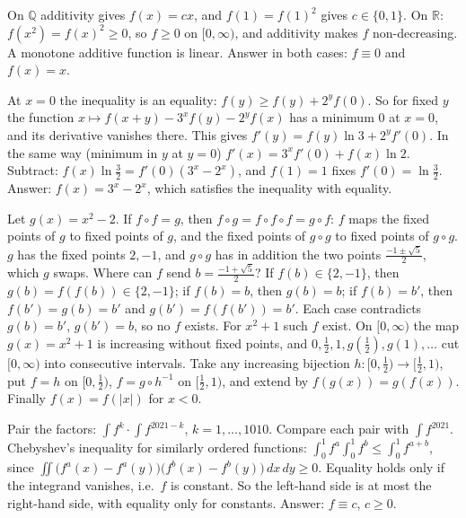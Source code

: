 \documentclass[11pt,a4paper]{article}
\begin{document}

 On \(\mathbb Q\) additivity gives \(f(x)=cx\), and \(f(1)=f(1)^2\) gives \(c\in\{0,1\}\).
 On \(\mathbb R\): \(f(x^2)=f(x)^2\ge0\), so \(f\ge0\) on \([0,\infty)\), and additivity makes \(f\) non-decreasing. A monotone additive function is linear. Answer in both cases: \(f\equiv0\) and \(f(x)=x\).

 At \(x=0\) the inequality is an equality: \(f(y)\ge f(y)+2^yf(0)\). So for fixed \(y\) the function \(x\mapsto f(x+y)-3^xf(y)-2^yf(x)\) has a minimum \(0\) at \(x=0\), and its derivative vanishes there.
 This gives \(f'(y)=f(y)\ln3+2^yf'(0)\). In the same way (minimum in \(y\) at \(y=0\)) \(f'(x)=3^xf'(0)+f(x)\ln2\).
 Subtract: \(f(x)\ln\frac32=f'(0)(3^x-2^x)\), and \(f(1)=1\) fixes \(f'(0)=\ln\frac32\). Answer: \(f(x)=3^x-2^x\), which satisfies the inequality with equality.

 Let \(g(x)=x^2-2\). If \(f\circ f=g\), then \(f\circ g=f\circ f\circ f=g\circ f\): \(f\) maps the fixed points of \(g\) to fixed points of \(g\), and the fixed points of \(g\circ g\) to fixed points of \(g\circ g\).
 \(g\) has the fixed points \(2,-1\), and \(g\circ g\) has in addition the two points \(\frac{-1\pm\sqrt5}2\), which \(g\) swaps. Where can \(f\) send \(b=\frac{-1+\sqrt5}2\)? If \(f(b)\in\{2,-1\}\), then \(g(b)=f(f(b))\in\{2,-1\}\); if \(f(b)=b\), then \(g(b)=b\); if \(f(b)=b'\), then \(f(b')=g(b)=b'\) and \(g(b')=f(f(b'))=b'\). Each case contradicts \(g(b)=b'\), \(g(b')=b\), so no \(f\) exists.
 For \(x^2+1\) such \(f\) exist. On \([0,\infty)\) the map \(g(x)=x^2+1\) is increasing without fixed points, and \(0,\frac12,1,g(\frac12),g(1),\dots\) cut \([0,\infty)\) into consecutive intervals. Take any increasing bijection \(h\colon[0,\frac12)\to[\frac12,1)\), put \(f=h\) on \([0,\frac12)\), \(f=g\circ h^{-1}\) on \([\frac12,1)\), and extend by \(f(g(x))=g(f(x))\). Finally \(f(x)=f(|x|)\) for \(x\lt0\).

 Pair the factors: \(\int f^k\cdot\int f^{2021-k}\), \(k=1,\dots,1010\). Compare each pair with \(\int f^{2021}\).
 Chebyshev's inequality for similarly ordered functions: \(\int_0^1f^a\int_0^1f^b\le\int_0^1f^{a+b}\), since \(\iint\bigl(f^a(x)-f^a(y)\bigr)\bigl(f^b(x)-f^b(y)\bigr)\,dx\,dy\ge0\). Equality holds only if the integrand vanishes, i.e.\ \(f\) is constant.
 So the left-hand side is at most the right-hand side, with equality only for constants. Answer: \(f\equiv c\), \(c\ge0\).
\end{document}
